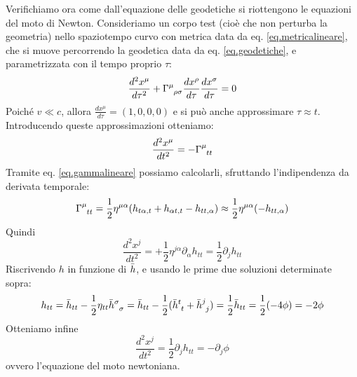 Verifichiamo ora come dall'equazione delle geodetiche si riottengono le equazioni del moto di Newton.
Consideriamo un corpo test (cioè che non perturba la geometria) nello spaziotempo curvo con metrica data da eq. \ref{eq.metricalineare}, che si muove percorrendo la geodetica data da eq. \ref{eq.geodetiche}, e parametrizzata con il tempo proprio $\tau$:
\begin{equation*}
    \frac{d^2 x^\mu}{d\tau^2} + \tensor{\Gamma}{^\mu_{\rho\sigma}}\frac{d x^\rho}{d\tau} \frac{d x^\sigma}{d\tau} = 0
\end{equation*}
Poiché $v \ll c$, allora $\frac{d x^\mu}{d\tau}= (1,0,0,0)$ e si può anche approssimare $\tau \approx t$. Introducendo queste approssimazioni otteniamo:
\begin{equation*}
    \frac{d^2 x^\mu}{dt^2} = - \tensor{\Gamma}{^\mu_{tt}}
\end{equation*}
Tramite eq. \ref{eq.gammalineare} possiamo calcolarli, sfruttando l'indipendenza da derivata temporale:
\begin{equation*}
    \tensor{\Gamma}{^\mu_{tt}} = \frac{1}{2}\eta^{\mu\alpha}( h_{t\alpha,t} + h_{\alpha t, t} - h_{tt,\alpha} ) \approx \frac{1}{2}\eta^{\mu\alpha}(-h_{tt,\alpha})
\end{equation*}
Quindi
\begin{equation*}
    \frac{d^2 x^j}{dt^2} = +\frac{1}{2}\eta^{j\alpha}\partial_\alpha h_{tt} = \frac{1}{2}\partial_j h_{tt}
\end{equation*}
Riscrivendo $h$ in funzione di $\Bar{h}$, e usando le prime due soluzioni determinate sopra:
\begin{equation*}
    h_{tt} = \Bar{h}_{tt} - \frac{1}{2}\eta_{tt}\tensor{\Bar{h}}{^\sigma_\sigma}= \Bar{h}_{tt} - \frac{1}{2}(\tensor{\Bar{h}}{^t_t}+\tensor{\Bar{h}}{^j_j})
    = \frac{1}{2}\Bar{h}_{tt} = \frac{1}{2}(-4\phi) = -2\phi
\end{equation*}
Otteniamo infine
\begin{equation*}
    \frac{d^2 x^j}{dt^2} = \frac{1}{2}\partial_j h_{tt} = -\partial_j \phi
\end{equation*}
ovvero l'equazione del moto newtoniana.
